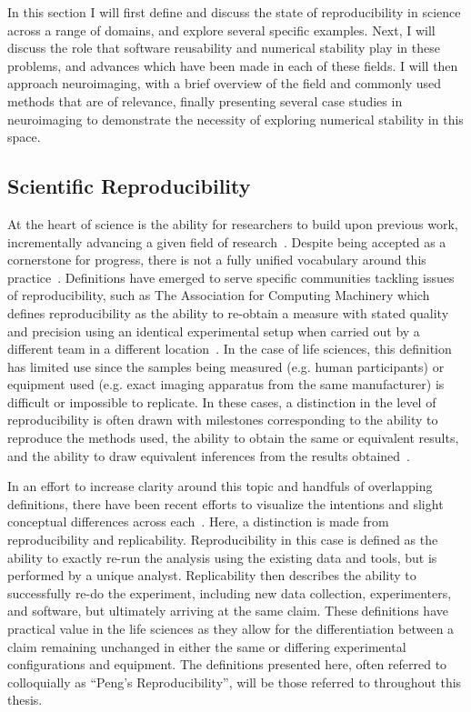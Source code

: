 In this section I will first define and discuss the state of reproducibility in science across a range of domains, and
explore several specific examples. Next, I will discuss the role that software reusability and numerical stability
play in these problems, and advances which have been made in each of these fields. I will then approach neuroimaging,
with a brief overview of the field and commonly used methods that are of relevance, finally presenting several case
studies in neuroimaging to demonstrate the necessity of exploring numerical stability in this space.

\subsection{Scientific Reproducibility}
At the heart of science is the ability for researchers to build upon previous work, incrementally advancing a given
field of research~\cite{salmon1999introduction,platt1964strong}. Despite being accepted as a cornerstone for progress,
there is not a fully unified vocabulary around this
practice~\cite{plesser2018reproducibility,patil2019visual,goodman2016does}. Definitions have emerged to serve specific
communities tackling issues of reproducibility, such as The Association for Computing Machinery which defines
reproducibility as the ability to re-obtain a measure with stated quality and precision using an identical experimental
setup when carried out by a different team in a different location~\cite{acm_2020}. In the case of life sciences, this
definition has limited use since the samples being measured (e.g. human participants) or equipment used (e.g. exact
imaging apparatus from the same manufacturer) is difficult or impossible to replicate. In these cases, a distinction in
the level of reproducibility is often drawn with milestones corresponding to the ability to reproduce the methods used,
the ability to obtain the same or equivalent results, and the ability to draw equivalent inferences from the results
obtained~\cite{plesser2018reproducibility}.

In an effort to increase clarity around this topic and handfuls of overlapping definitions, there have been recent
efforts to visualize the intentions and slight conceptual differences across each~\cite{patil2019visual}. Here, a
distinction is made from reproducibility and replicability. Reproducibility in this case is defined as the ability to
exactly re-run the analysis using the existing data and tools, but is performed by a unique analyst. Replicability then
describes the ability to successfully re-do the experiment, including new data collection, experimenters, and software,
but ultimately arriving at the same claim. These definitions have practical value in the life sciences as they allow for
the differentiation between a claim remaining unchanged in either the same or differing experimental configurations and
equipment. The definitions presented here, often referred to colloquially as ``Peng's Reproducibility'', will be those
referred to throughout this thesis.

